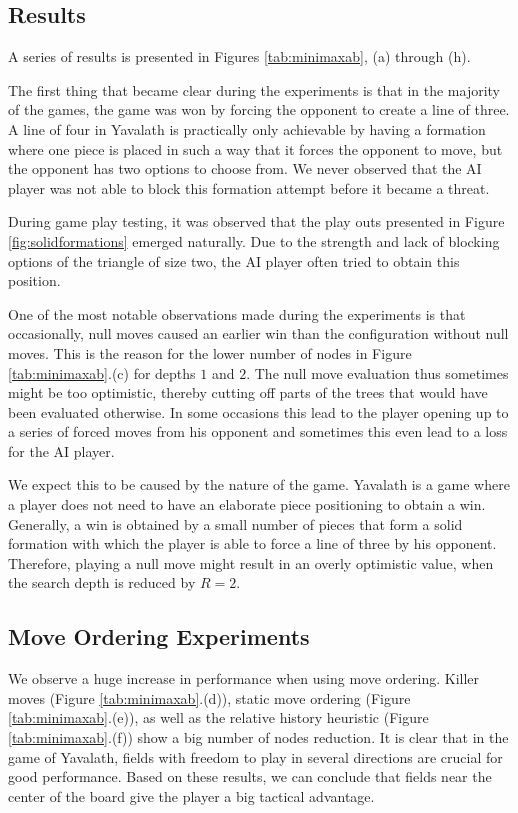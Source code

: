 \documentclass[11pt]{article}
\begin{document}
\subsection{Results}
\label{-subsec:results}

A series of results is presented in Figures \ref{tab:minimaxab}, (a) through (h).



The first thing that became clear during the experiments is that in the majority of the games, the game was won by forcing the opponent to create a line of three. A line of four in Yavalath is practically only achievable by having a formation where one piece is placed in such a way that it forces the opponent to move, but the opponent has two options to choose from. We never observed that the AI player was not able to block this formation attempt before it became a threat.

During game play testing, it was observed that the play outs presented in Figure \ref{fig:solidformations} emerged naturally. Due to the strength and lack of blocking options of the triangle of size two, the AI player often tried to obtain this position.

One of the most notable observations made during the experiments is that occasionally, null moves caused an earlier win than the configuration without null moves. This is the reason for the lower number of nodes in Figure \ref{tab:minimaxab}.(c) for depths $1$ and $2$. The null move evaluation thus sometimes might be too optimistic, thereby cutting off parts of the trees that would have been evaluated otherwise. In some occasions this lead to the player opening up to a series of forced moves from his opponent and sometimes this even lead to a loss for the AI player.

We expect this to be caused by the nature of the game. Yavalath is a game where a player does not need to have an elaborate piece positioning to obtain a win. Generally, a win is obtained by a small number of pieces that form a solid formation with which the player is able to force a line of three by his opponent. Therefore, playing a null move might result in an overly optimistic value, when the search depth is reduced by $R=2$.

\subsection{Move Ordering Experiments}
\label{-subsec:moveorderingexperiments}
We observe a huge increase in performance when using move ordering. Killer moves (Figure \ref{tab:minimaxab}.(d)), static move ordering (Figure \ref{tab:minimaxab}.(e)), as well as the relative history heuristic (Figure \ref{tab:minimaxab}.(f)) show a big number of nodes reduction. It is clear that in the game of Yavalath, fields with freedom to play in several directions are crucial for good performance. Based on these results, we can conclude that fields near the center of the board give the player a big tactical advantage. 
\end{document}
